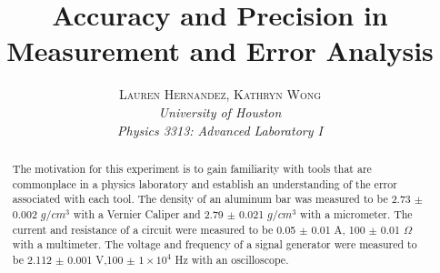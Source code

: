 \documentclass[twoside,10pt]{article}
\title{\vspace{-15mm}\fontsize{15pt}{10pt}\selectfont\textbf{Accuracy and Precision in Measurement and Error Analysis}} %
\author{
	\small
	\textsc{Lauren Hernandez, Kathryn Wong}\\[1mm] %
	\normalsize \textit{University of Houston}\\ %
	\normalsize \textit{Physics 3313: Advanced Laboratory I}\\ %
	\vspace{-10mm}
}
\date{}
\begin{document}
	
	\maketitle %
	
	\thispagestyle{fancy} %
	
	
	\begin{abstract}
		
		\noindent The motivation for this experiment is to gain familiarity with tools that are commonplace in a physics laboratory and establish an understanding of the error associated with each tool. The density of an aluminum bar was measured to be 2.73 $\pm$ 0.002 $g/cm^3$ with a Vernier Caliper and 2.79 $\pm$ 0.021 $g/cm^3$ with a micrometer. The current and resistance of a circuit were measured to be 0.05 $\pm$ 0.01 A, 100 $\pm$ 0.01 $\Omega$ with a multimeter. The voltage and frequency of a signal generator were measured to be 2.112 $\pm$ 0.001 V,100 $\pm$ $1 \times10^4$ Hz with an oscilloscope. 
		
	\end{abstract}
	
	
\end{document}
